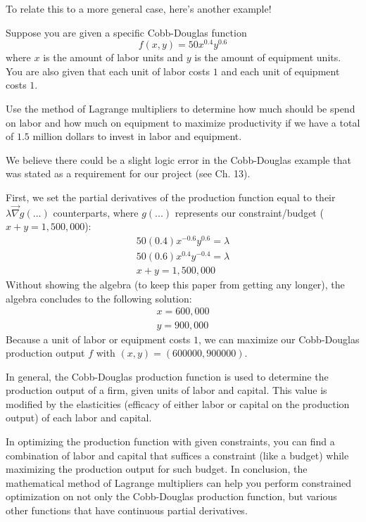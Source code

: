 To relate this to a more general case, here's another example!
\begin{eg}
	Suppose you are given a specific Cobb-Douglas function \[f(x, y) = 50x^{0.4}y^{0.6}\] where $x$ is the amount of labor units and $y$ is the amount of equipment units.
	You are also given that each unit of labor costs $1$ and each unit of equipment costs $1$.
	
	Use the method of Lagrange multipliers to determine how much should be spend on labor and how much on equipment to maximize productivity if we have a total of $1.5$ million dollars to invest in labor and equipment.
	
	We believe there could be a slight logic error in the Cobb-Douglas example that was stated as a requirement for our project (see Ch. 13).
\end{eg}

\pagebreak
First, we set the partial derivatives of the production function equal to their $\lambda \vec{\nabla}g(...)$ counterparts, where $g(...)$ represents our constraint/budget ($x + y = 1,500,000$):
\begin{align*}
	50(0.4)x^{-0.6}y^{0.6} = \lambda\\
	50(0.6)x^{0.4}y^{-0.4} = \lambda\\
	x + y = 1,500,000
\end{align*}
Without showing the algebra (to keep this paper from getting any longer), the algebra concludes to the following solution:
\begin{align*}
	x = 600,000\\
	y = 900,000
\end{align*}
Because a unit of labor or equipment costs $1$, we can maximize our Cobb-Douglas production output $f$ with $(x,y)=(600000, 900000)$.

In general, the Cobb-Douglas production function is used to determine the production output of a firm, given units of labor and capital.
This value is modified by the elasticities (efficacy of either labor or capital on the production output) of each labor and capital.

In optimizing the production function with given constraints, you can find a combination of labor and capital that suffices a constraint (like a budget) while maximizing the production output for such budget.
In conclusion, the mathematical method of Lagrange multipliers can help you perform constrained optimization on not only the Cobb-Douglas production function, but various other functions that have continuous partial derivatives.